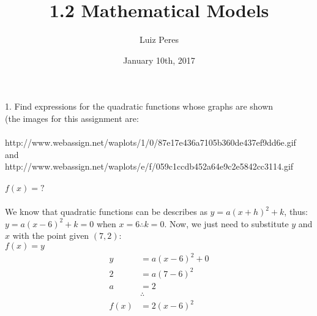 \documentclass{article}
\title{1.2 Mathematical Models}
\author{Luiz Peres}
\date{January 10th, 2017}
\begin{document}
\maketitle

1. Find expressions for the quadratic functions whose graphs are shown\\
(the images for this assignment are:\\\\
http://www.webassign.net/waplots/1/0/87e17e436a7105b360de437ef9dd6e.gif\\
and\\
http://www.webassign.net/waplots/e/f/059c1ccdb452a64e9c2e5842cc3114.gif
\\\\
$f(x) = ?$\\\\
We know that quadratic functions can be describes as $y = a(x + h)^2 + k$, thus:
$y = a(x - 6)^2 + k = 0$ when $x = 6 \therefore k = 0$.
Now, we just need to substitute $y$ and $x$ with the point given $(7,2)$:\\
$f(x) = y$\\
\begin{equation}
\begin{split}
    y & = a(x - 6)^2 + 0\\
    2 & = a(7 - 6)^2\\
    a & = 2\\
    & \therefore\\
    f(x) & = 2(x - 6)^2
\end{split}
\end{equation}
\end{document}
